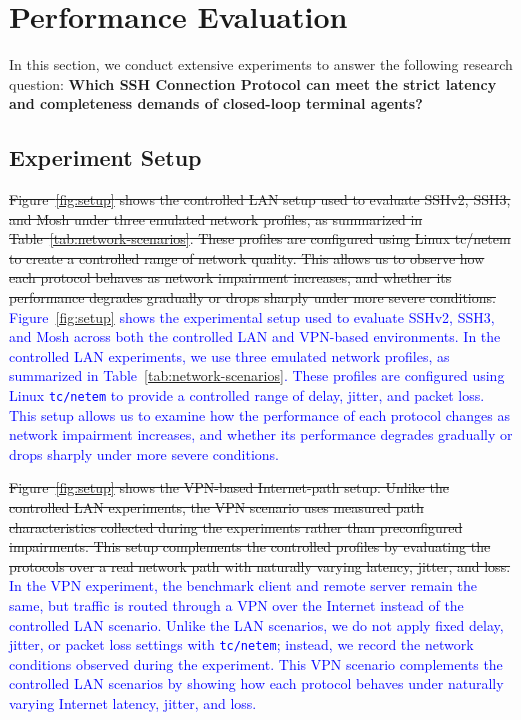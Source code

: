 \section{Performance Evaluation}
\label{sec:evaluation}
In this section, we conduct extensive experiments to answer the following research question: \textbf{Which SSH Connection Protocol can meet the strict latency and completeness demands of closed-loop terminal agents?}

\subsection{Experiment Setup}
\label{subsec:experiment-setup}

\sout{Figure~\ref{fig:setup} shows the controlled LAN setup used to evaluate SSHv2, SSH3, and Mosh under three emulated network profiles, as summarized in Table~\ref{tab:network-scenarios}. These profiles are configured using Linux tc/netem to create a controlled range of network quality. This allows us to observe how each protocol behaves as network impairment increases, and whether its performance degrades gradually or drops sharply under more severe conditions.}
\textcolor{blue}{Figure~\ref{fig:setup} shows the experimental setup used to evaluate SSHv2, SSH3, and Mosh across both the controlled LAN and VPN-based environments. In the controlled LAN experiments, we use three emulated network profiles, as summarized in Table~\ref{tab:network-scenarios}. These profiles are configured using Linux \texttt{tc/netem} to provide a controlled range of delay, jitter, and packet loss. This setup allows us to examine how the performance of each protocol changes as network impairment increases, and whether its performance degrades gradually or drops sharply under more severe conditions.}

\sout{Figure~\ref{fig:setup} shows the VPN-based Internet-path setup. Unlike the controlled LAN experiments, the VPN scenario uses measured path characteristics collected during the experiments rather than preconfigured impairments. This setup complements the controlled profiles by evaluating the protocols over a real network path with naturally varying latency, jitter, and loss.}
\textcolor{blue}{In the VPN experiment, the benchmark client and remote server remain the same, but traffic is routed through a VPN over the Internet instead of the controlled LAN scenario. Unlike the LAN scenarios, we do not apply fixed delay, jitter, or packet loss settings with \texttt{tc/netem}; instead, we record the network conditions observed during the experiment. This VPN scenario complements the controlled LAN scenarios by showing how each protocol behaves under naturally varying Internet latency, jitter, and loss.}

